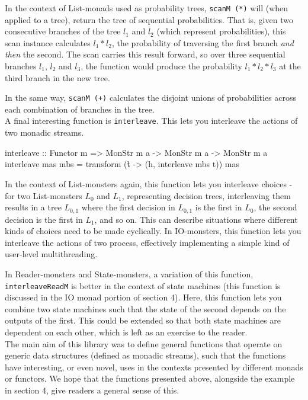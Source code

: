 \documentclass{article}
\begin{document}
In the context of List-monads used as probability trees, \verb+scanM (*)+ will (when applied to a tree), return the tree of sequential probabilities. That is, given two consecutive branches of the tree $l_1$ and $l_2$ (which represent probabilities), this scan instance calculates $l_1 * l_2$, the probability of traversing the first branch \emph{and then} the second. The scan carries this result forward, so over three sequential branches $l_1$, $l_2$ and $l_3$, the function would produce the probability $l_1 * l_2 * l_3$ at the third branch in the new tree. 

In the same way, \verb=scanM (+)= calculates the disjoint unions of probabilities across each combination of branches in the tree. \\

A final interesting function is \verb+interleave+. This lets you interleave the actions of two monadic streams. 

\begin{haskell}
interleave :: Functor m =>  MonStr m a -> MonStr m a -> MonStr m a
interleave mas mbs = transform (\h t -> (h, interleave mbs t)) mas
\end{haskell}

In the context of List-monsters again, this function lets you interleave choices - for two List-monsters $L_0$ and $L_1$, representing decision trees, interleaving them results in a tree $L_{0,1}$ where the first decision in $L_{0,1}$ is the first in $L_0$, the second decision is the first in $L_1$, and so on. This can describe situations where different kinds of choices need to be made cyclically. In IO-monsters, this function lets you interleave the actions of two process, effectively implementing a simple kind of user-level multithreading. 

In Reader-monsters and State-monsters, a variation of this function, \newline \verb+interleaveReadM+ is better in the context of state machines (this function is discussed in the IO monad portion of section 4). Here, this function lets you combine two state machines such that the state of the second depends on the outputs of the first. This could be extended so that both state machines are dependent on each other, which is left as an exercise to the reader. \\

The main aim of this library was to define general functions that operate on generic data structures (defined as monadic streams), such that the functions have interesting, or even novel, uses in the contexts presented by different monads or functors. We hope that the functions presented above, alongside the example in section 4, give readers a general sense of this.
\end{document}
